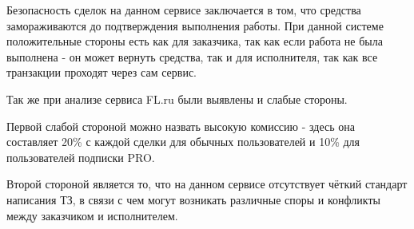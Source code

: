 Безопасность сделок на данном сервисе заключается в том, что средства замораживаются до подтверждения выполнения работы. При данной системе положительные стороны есть как для заказчика, так как если работа не была выполнена - он может вернуть средства, так и для исполнителя, так как все транзакции проходят через сам сервис.

Так же при анализе сервиса FL.ru были выявлены и слабые стороны.

Первой слабой стороной можно назвать высокую комиссию - здесь она составляет 20\% с каждой сделки для обычных пользователей и 10\% для пользователей подписки PRO.

Второй стороной является то, что на данном сервисе отсутствует чёткий стандарт написания ТЗ, в связи с чем могут возникать различные споры и конфликты между заказчиком и исполнителем.